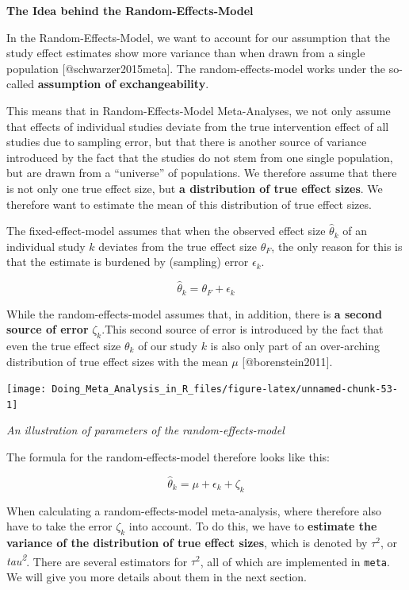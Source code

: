 \documentclass[]{book}
\begin{document}
\begin{rmdinfo}
\textbf{The Idea behind the Random-Effects-Model}

In the Random-Effects-Model, we want to account for our assumption that
the study effect estimates show more variance than when drawn from a
single population {[}@schwarzer2015meta{]}. The random-effects-model
works under the so-called \textbf{assumption of exchangeability}.

This means that in Random-Effects-Model Meta-Analyses, we not only
assume that effects of individual studies deviate from the true
intervention effect of all studies due to sampling error, but that there
is another source of variance introduced by the fact that the studies do
not stem from one single population, but are drawn from a ``universe''
of populations. We therefore assume that there is not only one true
effect size, but \textbf{a distribution of true effect sizes}. We
therefore want to estimate the mean of this distribution of true effect
sizes.

The fixed-effect-model assumes that when the observed effect size
\(\hat\theta_k\) of an individual study \(k\) deviates from the true
effect size \(\theta_F\), the only reason for this is that the estimate
is burdened by (sampling) error \(\epsilon_k\).

\[\hat\theta_k = \theta_F + \epsilon_k\]

While the random-effects-model assumes that, in addition, there is
\textbf{a second source of error} \(\zeta_k\).This second source of
error is introduced by the fact that even the true effect size
\(\theta_k\) of our study \(k\) is also only part of an over-arching
distribution of true effect sizes with the mean \(\mu\)
{[}@borenstein2011{]}.
\end{rmdinfo}

\begin{center}\texttt{[image: Doing\_Meta\_Analysis\_in\_R\_files/figure-latex/unnamed-chunk-53-1]} \end{center}

\emph{An illustration of parameters of the random-effects-model}

\begin{rmdinfo}
The formula for the random-effects-model therefore looks like this:

\[\hat\theta_k = \mu + \epsilon_k + \zeta_k\]

When calculating a random-effects-model meta-analysis, where therefore
also have to take the error \(\zeta_k\) into account. To do this, we
have to \textbf{estimate the variance of the distribution of true effect
sizes}, which is denoted by \(\tau^{2}\), or
\emph{tau\textsuperscript{2}}. There are several estimators for
\(\tau^{2}\), all of which are implemented in \texttt{meta}. We will
give you more details about them in the next section.
\end{rmdinfo}
\end{document}
